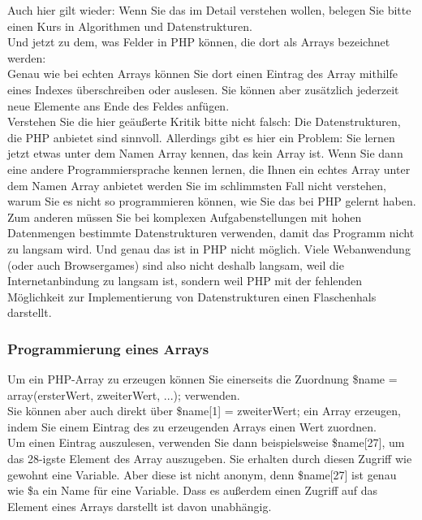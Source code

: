 Auch hier gilt wieder: Wenn Sie das im Detail verstehen wollen, belegen Sie bitte einen Kurs in Algorithmen und Datenstrukturen.\\

Und jetzt zu dem, was Felder in PHP können, die dort als Arrays bezeichnet werden:\\

Genau wie bei echten Arrays können Sie dort einen Eintrag des Array mithilfe eines Indexes überschreiben oder auslesen. Sie können aber zusätzlich jederzeit neue Elemente ans Ende des Feldes anfügen.\\

Verstehen Sie die hier geäußerte Kritik bitte nicht falsch: Die Datenstrukturen, die PHP anbietet sind sinnvoll. Allerdings gibt es hier ein Problem: Sie lernen jetzt etwas unter dem Namen Array kennen, das kein Array ist. Wenn Sie dann eine andere Programmiersprache kennen lernen, die Ihnen ein echtes Array unter dem Namen Array anbietet werden Sie im schlimmsten Fall nicht verstehen, warum Sie es nicht so programmieren können, wie Sie das bei PHP gelernt haben.\\

Zum anderen müssen Sie bei komplexen Aufgabenstellungen mit hohen Datenmengen bestimmte Datenstrukturen verwenden, damit das Programm nicht zu langsam wird. Und genau das ist in PHP nicht möglich. Viele Webanwendung (oder auch Browsergames) sind also nicht deshalb langsam, weil die Internetanbindung zu langsam ist, sondern weil PHP mit der fehlenden Möglichkeit zur Implementierung von Datenstrukturen einen Flaschenhals darstellt.

\subsubsection{Programmierung eines Arrays}

Um ein PHP-Array zu erzeugen können Sie einerseits die Zuordnung \$name = array(ersterWert, zweiterWert, ...); verwenden.\\

Sie können aber auch direkt über \$name[1] = zweiterWert; ein Array erzeugen, indem Sie einem Eintrag des zu erzeugenden Arrays einen Wert zuordnen.\\

Um einen Eintrag auszulesen, verwenden Sie dann beispielsweise \$name[27], um das 28-igste Element des Array auszugeben. Sie erhalten durch diesen Zugriff wie gewohnt eine Variable. Aber diese ist nicht anonym, denn \$name[27] ist genau wie \$a ein Name für eine Variable. Dass es außerdem einen Zugriff auf das Element eines Arrays darstellt ist davon unabhängig.

